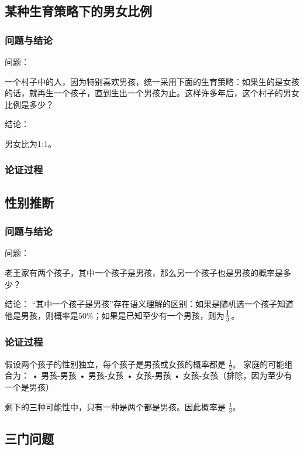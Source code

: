 
\subsection{某种生育策略下的男女比例}

\subsubsection{问题与结论}

问题：

一个村子中的人，因为特别喜欢男孩，统一采用下面的生育策略：如果生的是女孩的话，就再生一个孩子，直到生出一个男孩为止。这样许多年后，这个村子的男女比例是多少？

结论：

男女比为1:1。

\subsubsection{论证过程}

\subsection{性别推断}

\subsubsection{问题与结论}

问题：

老王家有两个孩子，其中一个孩子是男孩，那么另一个孩子也是男孩的概率是多少？

结论：
“其中一个孩子是男孩”存在语义理解的区别：如果是随机选一个孩子知道他是男孩，则概率是$50\%$；如果是已知至少有一个男孩，则为$\displaystyle 1\over 3$。

\subsubsection{论证过程}
假设两个孩子的性别独立，每个孩子是男孩或女孩的概率都是 $\frac{1}{2}$。
家庭的可能组合为：
	•	男孩-男孩
	•	男孩-女孩
	•	女孩-男孩
	•	女孩-女孩（排除，因为至少有一个是男孩）

剩下的三种可能性中，只有一种是两个都是男孩。因此概率是 $\frac{1}{3}$。

\subsection{三门问题}

